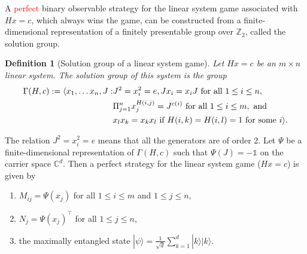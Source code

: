 \documentclass[11pt,letterpaper]{article}
\newcommand{\ket}[1]{|#1\rangle}
\newcommand{\tp}{^\intercal}
\DeclarePairedDelimiter{\ip}{\langle}{\rangle}
\newcommand{\C}{\mathbb{C}}
\newcommand{\Z}{\mathbb{Z}}
\newcommand{\1}{\mathbb{1}}
\newcommand{\sd}{\sqrt{d}}
\newcommand{\hf}[1]{\textcolor{red}{#1}}
\newtheorem{definition}[theorem]{Definition}
\theoremstyle{definition}
\begin{document}
A \hf{perfect} binary observable strategy for the linear system game associated with $Hx = c$, which always wins the game, can be constructed from
a finite-dimensional representation of a finitely presentable group
over $\Z_2$, called the solution group. 
\begin{definition}[Solution group of a linear system game]
	\label{def:presentation}
	Let $Hx = c$ be an $m \times n$ linear system. The solution group of this system
	is the group
	\begin{align*}
		\Gamma(H,c) := \ip{
		x_1,\dots x_n, J: &J^2 = x_i^2 = e, Jx_i = x_iJ \text{ for all }1 \leq i \leq n, \\
				& \Pi_{j=1}^n x_j^{H(i,j)} = J^{c(i)} \text{ for all } 1 \leq i \leq m, \text{ and } \\
				& x_l x_k = x_k x_l \text{ if } H(i,k) = H(i,l) = 1 \text{ for some } i
				}.
	\end{align*}
\end{definition}
The relation $J^2 = x_i^2 = e$ means that all the generators are of order $2$.
Let $\Psi$ be a finite-dimensional representation of $\Gamma(H, c)$ such that $\Psi(J) = -\1$ on the carrier space $\C^d$. 
Then a perfect strategy for 
the linear system game ($Hx = c$) is given by 
\begin{enumerate}
	\item $M_{ij} = \Psi(x_j)$ for all $ 1 \leq i \leq m$ and $1 \leq j \leq n$,
	\item $N_j = \Psi(x_j)\tp$ for all $1 \leq j \leq n$, 
	\item the maximally entangled state $\ket{\psi} = \frac{1}{\sd} \sum_{k=1}^d \ket{k}\ket{k}$.
\end{enumerate}


\end{document}
